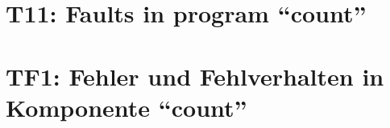 
\thispagestyle{empty}
\ifenglish
\section*{T11: Faults in program ``count''}

\fi
\ifgerman
\section*{TF1: Fehler und Fehlverhalten in Komponente "`count"'}

\fi


